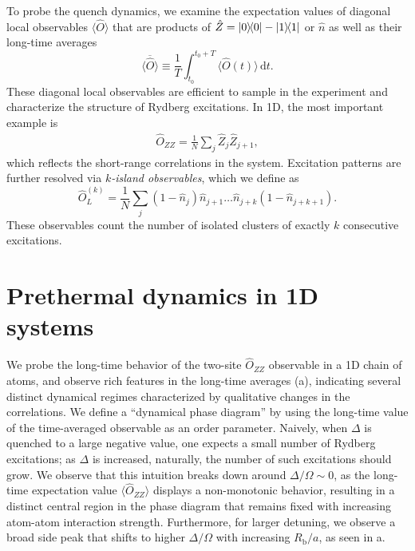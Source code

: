 \documentclass[english,floatfix,twocolumn,showpacs, aps, prx, reprint, superscriptaddress, longbibliography]{revtex4-2}
\begin{document}
To probe the quench dynamics, we examine the expectation values of diagonal local observables $\langle\hat{O}\rangle$ that are products of $\hat{Z} = \outerproduct{0}{0} - \outerproduct{1}{1}$ or $\hat{n}$ as well as their long-time averages
\begin{equation} 
\overline{\langle \hat{O} \rangle} \equiv \frac{1}{T} \int_{t_0}^{t_0 + T} \langle \hat{O}(t) \rangle \, \mathrm{d}t. 
\label{eq:observables}
\end{equation}
These diagonal local observables are efficient to sample in the experiment and characterize the structure of Rydberg excitations. In 1D, the most important example is
\begin{align}
\hat{O}_{ZZ} = \frac{1}{N} \sum_j \hat{Z}_j \hat{Z}_{j+1}, \label{eq:Onn}
\end{align}
which reflects the short-range correlations in the system. Excitation patterns are further resolved via \emph{$k$-island observables}, which we define as 
\begin{equation}
\hat{O}^{(k)}_L = \frac{1}{N} \sum_j (1-\hat{n}_{j}) \hat{n}_{j+1} \hdots \hat{n}_{j+k} (1-\hat{n}_{j+k+1}). \label{eq:OLk}
\end{equation}
These observables count the number of isolated clusters of exactly $k$ consecutive excitations.





\section*{Prethermal dynamics in 1D systems}
\label{sec:prethermal}

We probe the long-time behavior of the two-site $\hat{O}_{ZZ}$ observable in a 1D chain of atoms, and observe rich features in the long-time averages (a), indicating several distinct dynamical regimes characterized by qualitative changes in the correlations. We define a ``dynamical phase diagram'' by using the long-time value of the time-averaged observable as an order parameter. Naively, when $\Delta$ is quenched to a large negative value, one expects a small number of Rydberg excitations; as $\Delta$ is increased, naturally, the number of such excitations should grow. We observe that this intuition breaks down around $\Delta/\Omega \sim 0$, as the long-time expectation value $\langle \hat{O}_{ZZ} \rangle$ displays a non-monotonic behavior, resulting in a distinct central region in the phase diagram that remains fixed with increasing atom-atom interaction strength. Furthermore, for larger detuning, we observe a broad side peak that shifts to higher $\Delta / \Omega$ with increasing $R_\mathrm{b} / a$, as seen in a.
\end{document}
